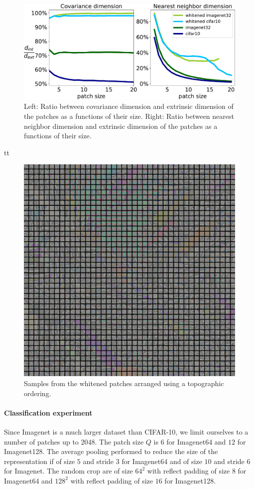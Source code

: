 \documentclass{article}
\begin{document}
\begin{figure}
	\includegraphics[width=.95\linewidth]{figures/intrinsic_dims}
	\caption{Left: Ratio between covariance dimension and extrinsic dimension of the patches as a functions of their size. Right: Ratio between nearest neighbor dimension and extrinsic dimension of the patches as a functions of their size.}
\end{figure}
tt

\begin{figure}
\centering
	\includegraphics[width=1.\linewidth]{figures/topographical_order_more_patches}
	\caption{Samples from the whitened patches arranged using a topographic ordering.}
\end{figure}


\paragraph{Classification experiment} Since Imagenet is a much larger dataset than CIFAR-10, we limit ourselves to a number of patches up to $2048$.
The patch size $Q$ is $6$ for Imagenet64 and $12$ for Imagenet128.
The average pooling performed to reduce the size of the representation if of size $5$ and stride $3$ for Imagenet64 and of size $10$ and stride $6$ for Imagenet.
The random crop are of size $64^2$ with reflect padding of size $8$ for Imagenet64 and  $128^2$ with reflect padding of size $16$ for Imagenet128.
\end{document}
